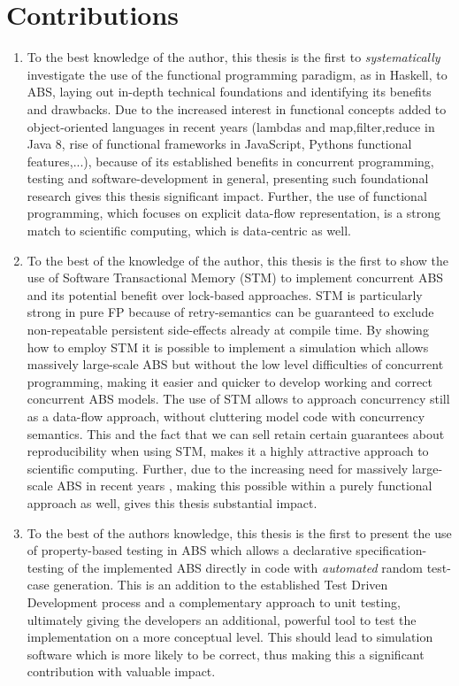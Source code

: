 \section{Contributions}
\begin{enumerate}
	\item To the best knowledge of the author, this thesis is the first to \textit{systematically} investigate the use of the functional programming paradigm, as in Haskell, to ABS, laying out in-depth technical foundations and identifying its benefits and drawbacks. Due to the increased interest in functional concepts added to object-oriented languages in recent years (lambdas and map,filter,reduce in Java 8, rise of functional frameworks in JavaScript, Pythons functional features,...), because of its established benefits in concurrent programming, testing and software-development in general, presenting such foundational research gives this thesis significant impact. Further, the use of functional programming, which focuses on explicit data-flow representation, is a strong match to scientific computing, which is data-centric as well.
	
	\item To the best of the knowledge of the author, this thesis is the first to show the use of Software Transactional Memory (STM) to implement concurrent ABS and its potential benefit over lock-based approaches. STM is particularly strong in pure FP because of retry-semantics can be guaranteed to exclude non-repeatable persistent side-effects already at compile time. By showing how to employ STM it is possible to implement a simulation which allows massively large-scale ABS but without the low level difficulties of concurrent programming, making it easier and quicker to develop working and correct concurrent ABS models. The use of STM allows to approach concurrency still as a data-flow approach, without cluttering model code with concurrency semantics. This and the fact that we can sell retain certain guarantees about reproducibility when using STM, makes it a highly attractive approach to scientific computing. Further, due to the increasing need for massively large-scale ABS in recent years \cite{lysenko_framework_2008}, making this possible within a purely functional approach as well, gives this thesis substantial impact.
	
	\item To the best of the authors knowledge, this thesis is the first to present the use of property-based testing in ABS which allows a declarative specification- testing of the implemented ABS directly in code with \textit{automated} random test-case generation. This is an addition to the established Test Driven Development process and a complementary approach to unit testing, ultimately giving the developers an additional, powerful tool to test the implementation on a more conceptual level. This should lead to simulation software which is more likely to be correct, thus making this a significant contribution with valuable impact.


\end{enumerate}
